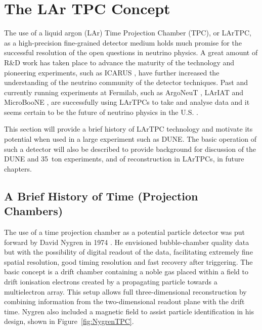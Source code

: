 \section{The LAr TPC Concept}\label{sec:LArTPC}

The use of a liquid argon (LAr) Time Projection Chamber (TPC), or LArTPC, as a high-precision fine-grained detector medium holds much promise for the successful resolution of the open questions in neutrino physics.  A great amount of R\&D work has taken place to advance the maturity of the technology and pioneering experiments, such as ICARUS \cite{ICARUS2004}, have further increased the understanding of the neutrino community of the detector techniques.  Past and currently running experiments at Fermilab, such as ArgoNeuT \cite{ArgoNeuT2012}, LArIAT \cite{LArIAT2014} and MicroBooNE \cite{MicroBooNE2017}, are successfully using LArTPCs to take and analyse data and it seems certain to be the future of neutrino physics in the U.S. \cite{Baller2014}.

This section will provide a brief history of LArTPC technology and motivate its potential when used in a large experiment such as DUNE.  The basic operation of such a detector will also be described to provide background for discussion of the DUNE and 35~ton experiments, and of reconstruction in LArTPCs, in future chapters.

\subsection{A Brief History of Time (Projection Chambers)}\label{sec:LArTPCHistory}

The use of a time projection chamber as a potential particle detector was put forward by David Nygren in 1974 \cite{Nygren1974}.  He envisioned bubble-chamber quality data but with the possibility of digital readout of the data, facilitating extremely fine spatial resolution, good timing resolution and fast recovery after triggering.  The basic concept is a drift chamber containing a noble gas placed within a field to drift ionisation electrons created by a propagating particle towards a multielectron array.  This setup allows full three-dimensional reconstruction by combining information from the two-dimensional readout plane with the drift time.  Nygren also included a magnetic field to assist particle identification in his design, shown in Figure~\ref{fig:NygrenTPC}.

